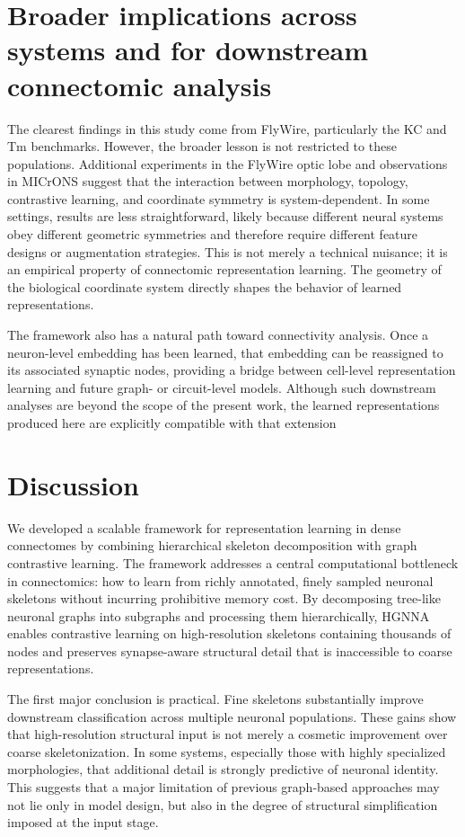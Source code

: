 \documentclass{article}
\begin{document}
\section{Broader implications across systems and for downstream connectomic analysis} 

The clearest findings in this study come from FlyWire, particularly the KC and Tm benchmarks. However, the broader lesson is not restricted to these populations. Additional experiments in the FlyWire optic lobe and observations in MICrONS suggest that the interaction between morphology, topology, contrastive learning, and coordinate symmetry is system-dependent. In some settings, results are less straightforward, likely because different neural systems obey different geometric symmetries and therefore require different feature designs or augmentation strategies. This is not merely a technical nuisance; it is an empirical property of connectomic representation learning. The geometry of the biological coordinate system directly shapes the behavior of learned representations.

The framework also has a natural path toward connectivity analysis. Once a neuron-level embedding has been learned, that embedding can be reassigned to its associated synaptic nodes, providing a bridge between cell-level representation learning and future graph- or circuit-level models. Although such downstream analyses are beyond the scope of the present work, the learned representations produced here are explicitly compatible with that extension


\FloatBarrier

\section{Discussion}

We developed a scalable framework for representation learning in dense connectomes by combining hierarchical skeleton decomposition with graph contrastive learning. The framework addresses a central computational bottleneck in connectomics: how to learn from richly annotated, finely sampled neuronal skeletons without incurring prohibitive memory cost. By decomposing tree-like neuronal graphs into subgraphs and processing them hierarchically, HGNNA enables contrastive learning on high-resolution skeletons containing thousands of nodes and preserves synapse-aware structural detail that is inaccessible to coarse representations.

The first major conclusion is practical. Fine skeletons substantially improve downstream classification across multiple neuronal populations. These gains show that high-resolution structural input is not merely a cosmetic improvement over coarse skeletonization. In some systems, especially those with highly specialized morphologies, that additional detail is strongly predictive of neuronal identity. This suggests that a major limitation of previous graph-based approaches may not lie only in model design, but also in the degree of structural simplification imposed at the input stage.
\end{document}
